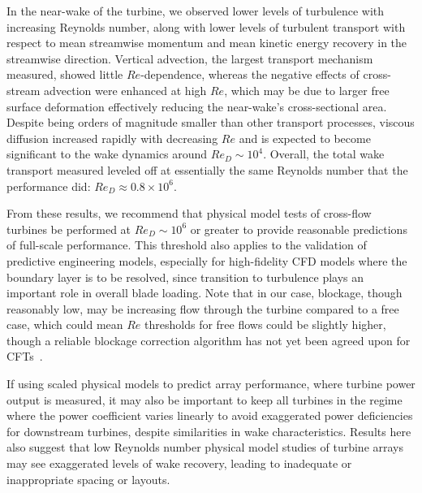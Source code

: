 In the near-wake of the turbine, we observed lower levels of turbulence with
increasing Reynolds number, along with lower levels of turbulent transport with
respect to mean streamwise momentum and mean kinetic energy recovery in the
streamwise direction. Vertical advection, the largest transport mechanism
measured, showed little $Re$-dependence, whereas the negative effects of
cross-stream advection were enhanced at high $Re$, which may be due to larger
free surface deformation effectively reducing the near-wake's cross-sectional
area. Despite being orders of magnitude smaller than other transport processes,
viscous diffusion increased rapidly with decreasing $Re$ and is expected to
become significant to the wake dynamics around $Re_D \sim 10^4$. Overall, the
total wake transport measured leveled off at essentially the same Reynolds
number that the performance did: $Re_D \approx 0.8 \times 10^6$.

From these results, we recommend that physical model tests of cross-flow
turbines be performed at $Re_D \sim 10^6$ or greater to provide reasonable
predictions of full-scale performance. This threshold also applies to the
validation of predictive engineering models, especially for high-fidelity CFD
models where the boundary layer is to be resolved, since transition to
turbulence plays an important role in overall blade loading. Note that in our
case, blockage, though reasonably low, may be increasing flow through the
turbine compared to a free case, which could mean $Re$ thresholds for free flows
could be slightly higher, though a reliable blockage correction algorithm has
not yet been agreed upon for CFTs~\cite{Cavagnaro2014}.

If using scaled physical models to predict array performance, where turbine
power output is measured, it may also be important to keep all turbines in the
regime where the power coefficient varies linearly to avoid exaggerated power
deficiencies for downstream turbines, despite similarities in wake
characteristics. Results here also suggest that low Reynolds number physical
model studies of turbine arrays may see exaggerated levels of wake recovery,
leading to inadequate or inappropriate spacing or layouts.